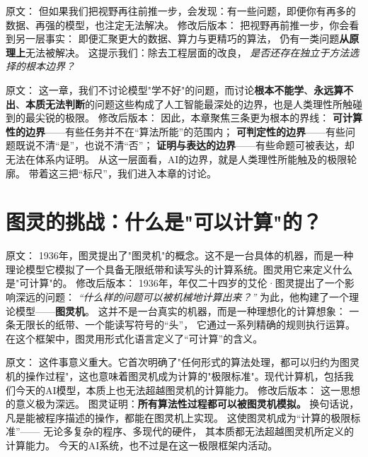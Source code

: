 原文：
但如果我们把视野再往前推一步，会发现：有一些问题，即便你有再多的数据、再强的模型，也注定无法解决。
修改后版本：
把视野再前推一步，你会看到另一层事实：  
即便汇聚更大的数据、算力与更精巧的算法，  
仍有一类问题\textbf{从原理上}无法被解决。  
这提示我们：除去工程层面的改良，  
\textit{是否还存在独立于方法选择的根本边界？}



原文：
这一章，我们不讨论模型"学不好"的问题，而讨论\textbf{根本不能学}、\textbf{永远算不出}、\textbf{本质无法判断}的问题这些构成了人工智能最深处的边界，也是人类理性所触碰到的最尖锐的极限。
修改后版本：
因此，本章聚焦三条更为根本的界线：  
\textbf{可计算性的边界}——有些任务并不在“算法所能”的范围内；  
\textbf{可判定性的边界}——有些问题既说不清“是”，也说不清“否”；  
\textbf{证明与表达的边界}——有些命题可被表达，却无法在体系内证明。  
从这一层面看，AI的边界，就是人类理性所能触及的极限轮廓。  
带着这三把“标尺”，我们进入本章的讨论。

\section*{图灵的挑战：什么是"可以计算"的？}

原文：
1936年，图灵提出了"图灵机"的概念。这不是一台具体的机器，而是一种理论模型它模拟了一个具备无限纸带和读写头的计算系统。图灵用它来定义什么是"可计算"的。
修改后版本：
1936年，年仅二十四岁的艾伦·图灵提出了一个影响深远的问题：  
\textit{“什么样的问题可以被机械地计算出来？”}  
为此，他构建了一个理论模型——\textbf{图灵机}。  
这并不是一台真实的机器，而是一种理想化的计算想象：  
一条无限长的纸带、一个能读写符号的“头”，  
它通过一系列精确的规则执行运算。  
在这个框架中，图灵用形式化语言定义了“可计算”的含义。



原文：
这件事意义重大。它首次明确了"任何形式的算法处理，都可以归约为图灵机的操作过程"，这也意味着图灵机成为计算的"极限标准"。现代计算机，包括我们今天的AI模型，本质上也无法超越图灵机的计算能力。
修改后版本：
这一思想的意义极为深远。  
图灵证明：\textbf{所有算法性过程都可以被图灵机模拟。}  
换句话说，凡是能被程序描述的操作，都能在图灵机上实现。  
这使图灵机成为“计算的极限标准”——  
无论多复杂的程序、多现代的硬件，  
其本质都无法超越图灵机所定义的计算能力。  
今天的AI系统，也不过是在这一极限框架内活动。



